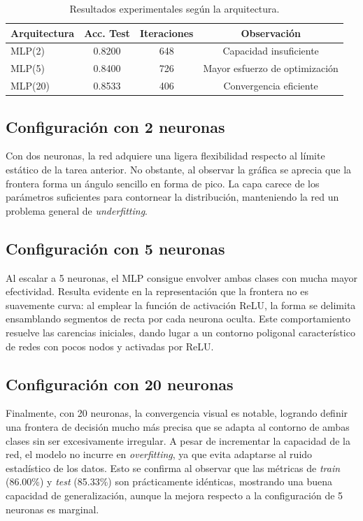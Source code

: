 \documentclass[../../__memoria.tex]{subfiles}
\begin{document}
\begin{table}[H]
  \centering
  \caption{Resultados experimentales según la arquitectura.}
  \label{tab:t2_metricas}
  \begin{tabular}{lccc}
    \toprule
    \textbf{Arquitectura} & \textbf{Acc. Test} & \textbf{Iteraciones} & \textbf{Observación}           \\
    \midrule
    MLP(2)                & 0.8200             & 648                  & Capacidad insuficiente         \\
    MLP(5)                & 0.8400             & 726                  & Mayor esfuerzo de optimización \\
    MLP(20)               & 0.8533             & 406                  & Convergencia eficiente         \\
    \bottomrule
  \end{tabular}
\end{table}

\subsection*{Configuración con 2 neuronas}
Con dos neuronas, la red adquiere una ligera flexibilidad respecto al límite estático de la tarea anterior. No obstante, al observar la gráfica se aprecia que la frontera forma un ángulo sencillo en forma de pico. La capa carece de los parámetros suficientes para contornear la distribución, manteniendo la red un problema general de \textit{underfitting}.

\subsection*{Configuración con 5 neuronas}
Al escalar a 5 neuronas, el MLP consigue envolver ambas clases con mucha mayor efectividad. Resulta evidente en la representación que la frontera no es suavemente curva: al emplear la función de activación ReLU, la forma se delimita ensamblando segmentos de recta por cada neurona oculta. Este comportamiento resuelve las carencias iniciales, dando lugar a un contorno poligonal característico de redes con pocos nodos y activadas por ReLU.

\subsection*{Configuración con 20 neuronas}
Finalmente, con 20 neuronas, la convergencia visual es notable, logrando definir una frontera de decisión mucho más precisa que se adapta al contorno de ambas clases sin ser excesivamente irregular. A pesar de incrementar la capacidad de la red, el modelo no incurre en \textit{overfitting}, ya que evita adaptarse al ruido estadístico de los datos. Esto se confirma al observar que las métricas de \textit{train} (86.00\%) y \textit{test} (85.33\%) son prácticamente idénticas, mostrando una buena capacidad de generalización, aunque la mejora respecto a la configuración de 5 neuronas es marginal.
\end{document}
